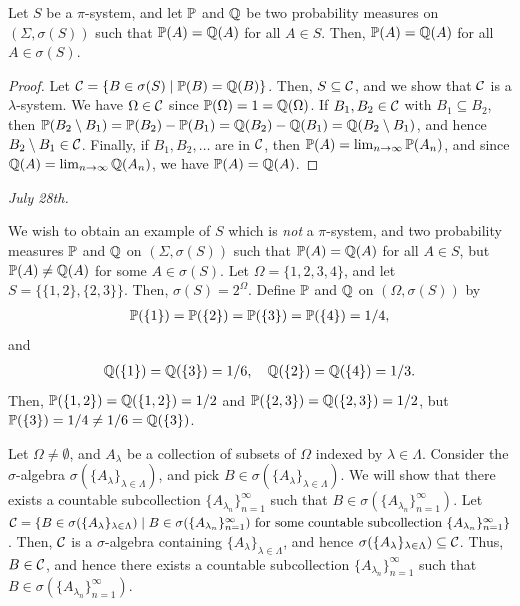\begin{lemma}
    Let $S$ be a $\pi$-system, and let $\mathbb{P}$ and $\mathbb{Q}$ be two probability measures on $(\Sigma,\sigma(S))$ such that $\mathbb{P}(A) = \mathbb{Q}(A)$ for all $A \in S$. Then, $\mathbb{P}(A) = \mathbb{Q}(A)$ for all $A \in \sigma(S)$.
\end{lemma}
\begin{proof}
    Let $\mathcal{C} = \{B \in \sigma(S) \mid \mathbb{P}(B) = \mathbb{Q}(B)\}$. Then, $S \subseteq \mathcal{C}$, and we show that $\mathcal{C}$ is a $\lambda$-system. We have $\Omega \in \mathcal{C}$ since $\mathbb{P}(\Omega) = 1 = \mathbb{Q}(\Omega)$. If $B_{1},B_{2} \in \mathcal{C}$ with $B_{1} \subseteq B_{2}$, then $\mathbb{P}(B_{2}\setminus B_{1}) = \mathbb{P}(B_{2}) - \mathbb{P}(B_{1}) = \mathbb{Q}(B_{2}) - \mathbb{Q}(B_{1}) = \mathbb{Q}(B_{2}\setminus B_{1})$, and hence $B_{2}\setminus B_{1} \in \mathcal{C}$. Finally, if $B_{1},B_{2},\ldots$ are in $\mathcal{C}$, then $\mathbb{P}(A) = \lim_{n \to \infty} \mathbb{P}(A_n)$, and since $\mathbb{Q}(A) = \lim_{n \to \infty} \mathbb{Q}(A_n)$, we have $\mathbb{P}(A) = \mathbb{Q}(A)$.
\end{proof}

\textit{July 28th.}

\begin{example}
    We wish to obtain an example of $S$ which is \textit{not} a $\pi$-system, and two probability measures $\mathbb{P}$ and $\mathbb{Q}$ on $(\Sigma,\sigma(S))$ such that $\mathbb{P}(A) = \mathbb{Q}(A)$ for all $A \in S$, but $\mathbb{P}(A) \neq \mathbb{Q}(A)$ for some $A \in \sigma(S)$. Let $\Omega = \{1,2,3,4\}$, and let $S = \{\{1,2\},\{2,3\}\}$. Then, $\sigma(S) = 2^{\Omega}$. Define $\mathbb{P}$ and $\mathbb{Q}$ on $(\Omega,\sigma(S))$ by
    \begin{align}
        \mathbb{P}(\{1\}) = \mathbb{P}(\{2\}) = \mathbb{P}(\{3\}) = \mathbb{P}(\{4\}) = 1/4,
    \end{align}
    and
    \begin{align}
        \mathbb{Q}(\{1\}) = \mathbb{Q}(\{3\}) = 1/6, \quad \mathbb{Q}(\{2\}) = \mathbb{Q}(\{4\}) = 1/3.
    \end{align}
    Then, $\mathbb{P}(\{1,2\}) = \mathbb{Q}(\{1,2\}) = 1/2$ and $\mathbb{P}(\{2,3\}) = \mathbb{Q}(\{2,3\}) = 1/2$, but $\mathbb{P}(\{3\}) = 1/4 \neq 1/6 = \mathbb{Q}(\{3\})$.
\end{example}

\begin{example}
    Let $\Omega \neq \emptyset$, and $A_{\lambda}$ be a collection of subsets of $\Omega$ indexed by $\lambda \in \Lambda$. Consider the $\sigma$-algebra $\sigma(\{A_{\lambda}\}_{\lambda \in \Lambda})$, and pick $B \in \sigma(\{A_{\lambda}\}_{\lambda \in \Lambda})$. We will show that there exists a countable subcollection $\{A_{\lambda_{n}}\}_{n=1}^{\infty}$ such that $B \in \sigma(\{A_{\lambda_{n}}\}_{n=1}^{\infty})$. Let $\mathcal{C} = \{B \in \sigma(\{A_{\lambda}\}_{\lambda \in \Lambda}) \mid B \in \sigma(\{A_{\lambda_{n}}\}_{n=1}^{\infty}) \text{ for some countable subcollection } \{A_{\lambda_{n}}\}_{n=1}^{\infty}\}$. Then, $\mathcal{C}$ is a $\sigma$-algebra containing $\{A_{\lambda}\}_{\lambda \in \Lambda}$, and hence $\sigma(\{A_{\lambda}\}_{\lambda \in \Lambda}) \subseteq \mathcal{C}$. Thus, $B \in \mathcal{C}$, and hence there exists a countable subcollection $\{A_{\lambda_{n}}\}_{n=1}^{\infty}$ such that $B \in \sigma(\{A_{\lambda_{n}}\}_{n=1}^{\infty})$.
\end{example}

